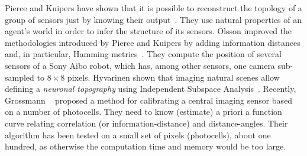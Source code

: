 Pierce and Kuipers %
have shown
that it is possible to reconstruct the topology of a group of sensors just by knowing their output~\cite{Kuipers97}.
They use natural %
properties of an agent's world in order to infer the structure of its sensors.
%
Olsson \etal improved the methodologies introduced by Pierce and Kuipers by adding information distances and,
in particular, Hamming metrics~\cite{Olsson04,Olsson06}.
They compute the position of several sensors of a Sony Aibo robot, which has, among other sensors, one camera sub-sampled to $8\times 8$ pixels.
%
%
%
Hyvarinen \etal shown that imaging natural scenes allow defining a \emph{neuronal topography} %
using Independent Subspace Analysis~\cite{nis09}. %
%
Recently, Grossmann \etal~\cite{Grossmann10} proposed a method for calibrating a central imaging sensor based on a number of photocells. They need to know (estimate) a priori a function curve relating correlation (or information-distance) and distance-angles. %
Their algorithm has been tested on a small set of pixels (photocells), about one hundred, as otherwise the computation time and memory would be too large.

